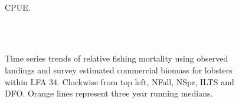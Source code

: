 \documentclass[11pt]{article}
\newcommand{\e}{/SpinDr/backup/bio_data/bio.lobster/figures/LFA34Assessment/}
\begin{document}
\begin{figure}
        \centering
    \\
        
         \caption{CPUE.}
        \end{figure}

\begin{figure}
        \centering
    \\
                \\
           
                
        
         \caption{Time series trends of relative fishing mortality using observed landings and survey estimated commercial biomass for lobsters within LFA 34. Clockwise from top left, NFall, NSpr, ILTS and DFO. Orange lines represent three year running medians.}
        \end{figure}
\end{document}
